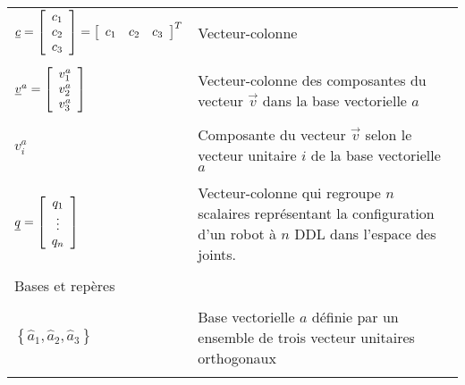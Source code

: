 \begin{center}
\begin{tabular}{p{5cm}  p{9cm}}
$\underline{c} = \left[ \begin{array}{c}
	c_1 \\ c_2 \\ c_3
\end{array}  \right] = \left[\begin{array}{ccc} c_1 & c_2 & c_3 \end{array}\right]^T $    
 & Vecteur-colonne \\   &  \\
$\underline{v}^{a}  = \left[ \begin{array}{c}
	v_1^a \\ v_2^a \\ v_3^a
\end{array}  \right]$   & Vecteur-colonne des composantes du vecteur $\vec{v}$ dans la base vectorielle $a$  \\   &  \\
$v^{a}_i$        & Composante du vecteur $\vec{v}$ selon le vecteur unitaire $i$ de la base vectorielle $a$ \\   &  \\
$\underline{q} = \left[ \begin{array}{c}
	q_1 \\  \vdots \\ q_n
\end{array}  \right] $            & Vecteur-colonne qui regroupe $n$ scalaires représentant la configuration d'un robot à $n$ DDL dans l'espace des joints. \\   &  \\
\multicolumn{2}{l}{Bases et repères} \\ \hline \\
$\left\{ \hat{a}_1 , \hat{a}_2 , \hat{a}_3 \right\}$  & Base vectorielle $a$ définie par un ensemble de trois vecteur unitaires orthogonaux \\   &  \\ 

\end{tabular}
\end{center}
